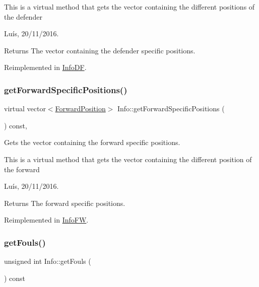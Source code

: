 This is a virtual method that gets the vector containing the different positions of the defender

Luís, 20/11/2016. 

\begin{DoxyReturn}{Returns}
The vector containing the defender specific positions. 
\end{DoxyReturn}


Reimplemented in \hyperlink{class_info_d_f_a8e30128320b378b09477070781f9fe98}{Info\+DF}.

\hypertarget{class_info_abff2f6cd7a845b8bd80c97d9d456e07e}{}\label{class_info_abff2f6cd7a845b8bd80c97d9d456e07e} 
\subsubsection{\texorpdfstring{get\+Forward\+Specific\+Positions()}{getForwardSpecificPositions()}}
{\footnotesize\ttfamily virtual vector$<$\hyperlink{_utils_8hpp_ae6ffae6f01bd3312aac4a44642f14620}{Forward\+Position}$>$ Info\+::get\+Forward\+Specific\+Positions (\begin{DoxyParamCaption}{ }\end{DoxyParamCaption}) const\hspace{0.3cm}{\ttfamily [inline]}, {\ttfamily [virtual]}}



Gets the vector containing the forward specific positions. 

This is a virtual method that gets the vector containing the different position of the forward

Luís, 20/11/2016. 

\begin{DoxyReturn}{Returns}
The forward specific positions. 
\end{DoxyReturn}


Reimplemented in \hyperlink{class_info_f_w_a9bce628dbf938dc530f9333d587b100a}{Info\+FW}.

\hypertarget{class_info_a94195f6bb305a247355f4038c18b3a67}{}\label{class_info_a94195f6bb305a247355f4038c18b3a67} 
\subsubsection{\texorpdfstring{get\+Fouls()}{getFouls()}}
{\footnotesize\ttfamily unsigned int Info\+::get\+Fouls (\begin{DoxyParamCaption}{ }\end{DoxyParamCaption}) const}



